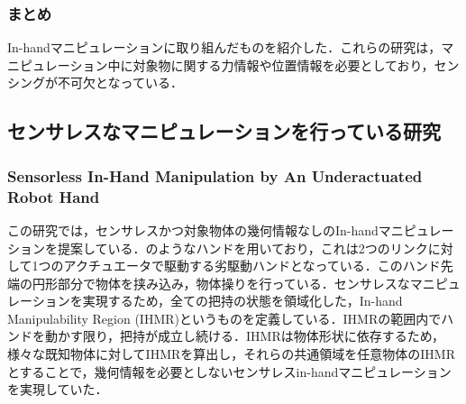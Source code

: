 \documentclass[a4paper,twoside,12pt,papersize, dvipdfmx]{iirthesis}
\begin{document}
\subsubsection{まとめ}
In-handマニピュレーションに取り組んだものを紹介した．これらの研究は，マニピュレーション中に対象物に関する力情報や位置情報を必要としており，センシングが不可欠となっている．


\subsection{センサレスなマニピュレーションを行っている研究}
\subsubsection{Sensorless In-Hand Manipulation by An Underactuated Robot Hand \cite{ospina2020}}	\label{sec::ospina}
この研究では，センサレスかつ対象物体の幾何情報なしのIn-handマニピュレーションを提案している．のようなハンドを用いており，これは2つのリンクに対して1つのアクチュエータで駆動する劣駆動ハンドとなっている．このハンド先端の円形部分で物体を挟み込み，物体操りを行っている．センサレスなマニピュレーションを実現するため，全ての把持の状態を領域化した，In-hand Manipulability Region (IHMR)というものを定義している．IHMRの範囲内でハンドを動かす限り，把持が成立し続ける．IHMRは物体形状に依存するため，様々な既知物体に対してIHMRを算出し，それらの共通領域を任意物体のIHMRとすることで，幾何情報を必要としないセンサレスin-handマニピュレーションを実現していた．
\end{document}
